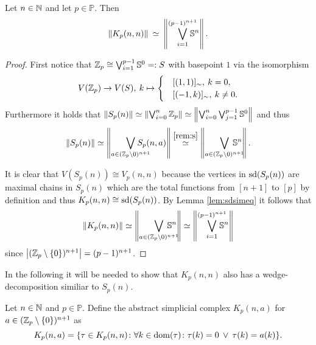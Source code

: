 \begin{lemma}
  Let $n \in \mathbb{N}$ and let $p \in \mathbb{P}$. Then
  \begin{equation*}
    \lVert K_p(n,n) \rVert \: \simeq \: \left\lVert\bigvee_{i=1}^{(p-1)^{n+1}}\hspace*{-10px}\mathbb{S}^{n}\right\rVert.
  \end{equation*}
\end{lemma}

\begin{proof}
  First notice that $\mathbb{Z}_p \cong \bigvee_{i=1}^{p-1}\mathbb{S}^0 =: S$ with basepoint $1$ via the isomorphism
  \begin{equation*}
    V(\mathbb{Z}_p) \to V(S), \: k \mapsto \begin{cases}
      &[(1, 1)]_\sim, \: k = 0, \\
      &[(-1,k)]_\sim, \: k \neq 0.
    \end{cases}
  \end{equation*}
  Furthermore it holds that $\lVert S_p(n) \rVert \simeq \left\lVert \bigvee_{i=0}^n\mathbb{Z}_p \right\rVert \simeq \left\lVert \bigvee_{i=0}^n\bigvee_{j=1}^{p-1}\mathbb{S}^0 \right\rVert$ and thus
  \begin{equation*}
    \lVert S_p(n) \rVert \simeq \left\lVert \bigvee_{a\in(\Z_p \setminus {0})^{n+1}} \hspace*{-17px}S_p(n,a) \right\rVert \overset{\ref{rem:s}}{\simeq} \left\lVert \bigvee_{a\in(\Z_p \setminus {0})^{n+1}}\hspace*{-15px}\mathbb{S}^n \right\rVert.
  \end{equation*}

  It is clear that $V(S_p(n)) \cong V_p(n,n)$ because the vertices in ${\rm sd}(S_p(n))$ are maximal chains in $S_p(n)$ which are the total functions from $[n+1]$ to $[p]$ by definition and thus $K_p(n,n) \cong {\rm sd}(S_p(n))$. By Lemma \ref{lem:sdsimeq} it follows that
  \begin{equation*}
    \lVert K_p(n, n) \rVert \simeq \left\lVert \bigvee_{a\in(\Z_p \setminus {0})^{n+1}}\hspace*{-15px}\mathbb{S}^n \right\rVert \simeq \left\lVert \bigvee_{i=1}^{(p-1)^{n+1}}\hspace*{-10px}\mathbb{S}^n \right\rVert
  \end{equation*}
  since $\left|(\mathbb{Z}_p\setminus\{0\})^{n+1}\right| = (p-1)^{n+1}$.
\end{proof}

In the following it will be needed to show that $K_p(n,n)$ also has a wedge-decomposition similiar to $S_p(n)$.
\begin{defin}
  Let $n\in\mathbb{N}$ and $p\in \mathbb{P}$. Define the abstract simplicial complex $K_p(n,a)$ for $a \in (\mathbb{Z}_p\setminus\{0\})^{n+1}$ as
  \begin{equation*}
    K_p(n,a) = \{\tau \in K_p(n,n)\colon \forall k\in{\rm dom}(\tau)\colon \tau(k) = 0 \: \lor \: \tau(k) = a(k)\}. \qedhere
  \end{equation*}
\end{defin}


